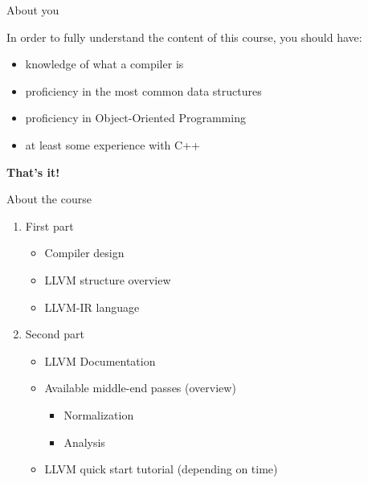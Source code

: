 \documentclass[10pt,mathserif]{beamer}
\begin{document}
\begin{frame}[t]{About you}
	\vspace{\fill}
	\begin{center}
  \begin{varwidth}{8.5cm}
  In order to fully understand the content of this course,
  you should have:
  \smallskip
  \begin{itemize}
    \item knowledge of what a compiler is
    \item proficiency in the most common data structures
    \item proficiency in Object-Oriented Programming
    \item at least some experience with C++
  \end{itemize}
  \end{varwidth}
  \medskip
  \end{center}
   \begin{center}
  \textbf{\large That's it!}
  \end{center}
  \vspace{\fill}
\end{frame}

\begin{frame}[t]{About the course}
\begin{center}
\begin{varwidth}{8.5cm}
  \begin{Large}
  \begin{enumerate}
  	\setlength\itemsep{8pt}
    \item First part \vspace{6pt}
      \begin{itemize}
      	\normalsize \setlength\itemsep{4pt}
        \item Compiler design
        \item LLVM structure overview
        \item LLVM-IR language
    	\end{itemize}
    \item Second part \vspace{6pt}
      \begin{itemize}
      \normalsize \setlength\itemsep{4pt}
        \item LLVM Documentation
        \item Available middle-end passes (overview)
        \begin{itemize}
        	\normalsize
          \item Normalization
          \item Analysis
        \end{itemize}
        \item LLVM quick start tutorial (depending on time)
      \end{itemize}
  \end{enumerate}
	\end{Large}
\end{varwidth}
\end{center}
\end{frame}
\end{document}
